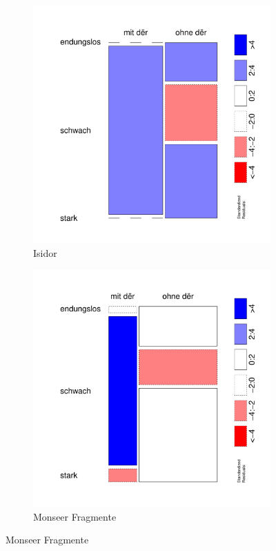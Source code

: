 \begin{figure}
\begin{subfigure}[b]{.5\linewidth}
  \includegraphics[width=6 cm]{generated/images/adjektive-I}
\caption {Isidor}
\end{subfigure}%
\begin{subfigure}[b]{.5\linewidth}
  \includegraphics[width=6 cm]{generated/images/adjektive-M}
\caption {Monseer Fragmente}
\end{subfigure}


\end{figure}
